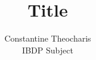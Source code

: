 

\title{Title}
\author{%
    Constantine Theocharis \\
    IBDP Subject
}


\maketitle



\clearpage
\printbibliography

